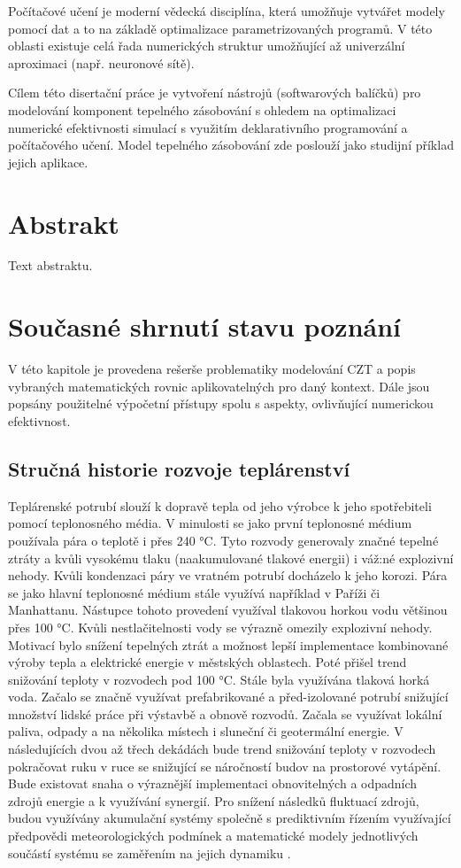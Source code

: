 Počítačové učení je moderní vědecká disciplína, která umožňuje vytvářet modely
pomocí dat a to na základě optimalizace parametrizovaných programů. V této
oblasti existuje celá řada numerických struktur umožňující až univerzální
aproximaci (např. neuronové sítě).

Cílem této disertační práce je vytvoření nástrojů (softwarových balíčků) pro
modelování komponent tepelného zásobování s ohledem na optimalizaci numerické
efektivnosti simulací s využitím deklarativního programování a počítačového
učení. Model tepelného zásobování zde poslouží jako studijní příklad jejich
aplikace.

\chapter{Abstrakt}
\label{abstrakt}
Text abstraktu.

\chapter{Současné shrnutí stavu poznání}
\label{struktura}
V této kapitole je provedena rešerše problematiky modelování CZT a popis
vybraných matematických rovnic aplikovatelných pro daný kontext. Dále jsou
popsány použitelné výpočetní přístupy spolu s aspekty, ovlivňující numerickou
efektivnost.

\section{Stručná historie rozvoje teplárenství}
\label{sec:history}
Teplárenské potrubí slouží k dopravě tepla od jeho výrobce k jeho spotřebiteli
pomocí teplonosného média. V minulosti se jako první teplonosné médium
používala pára o teplotě i přes 240 °C. Tyto rozvody generovaly značné tepelné
ztráty a kvůli vysokému tlaku (naakumulované tlakové energii) i váž:né
explozivní nehody. Kvůli kondenzaci páry ve vratném potrubí docházelo k jeho
korozi. Pára se jako hlavní teplonosné médium stále využívá například v Paříži
či Manhattanu. Nástupce tohoto provedení využíval tlakovou horkou vodu většinou
přes 100 °C. Kvůli nestlačitelnosti vody se výrazně omezily explozivní nehody.
Motivací bylo snížení tepelných ztrát a možnost lepší implementace kombinované
výroby tepla a elektrické energie v městských oblastech. Poté přišel trend
snižování teploty v rozvodech pod 100 °C. Stále byla využívána tlaková horká
voda. Začalo se značně využívat prefabrikované a před-izolované potrubí
snižující množství lidské práce při výstavbě a obnově rozvodů. Začala se
využívat lokální paliva, odpady a na několika místech i sluneční či geotermální
energie. V následujících dvou až třech dekádách bude trend snižování teploty v
rozvodech pokračovat ruku v ruce se snižující se náročností budov na prostorové
vytápění. Bude existovat snaha o výraznější implementaci obnovitelných a
odpadních zdrojů energie a k využívání synergií. Pro snížení následků fluktuací
zdrojů, budou využívány akumulační systémy společně s prediktivním řízením
využívající předpovědi meteorologických podmínek a matematické modely
jednotlivých součástí systému se zaměřením na jejich dynamiku \cite{Lund2014}.

